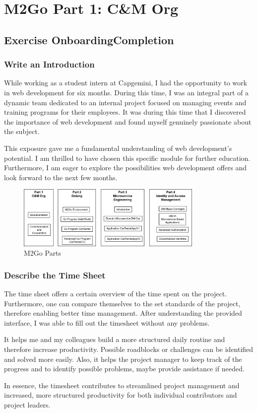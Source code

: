 \chapter{M2Go Part 1: C\&M Org}
\label{cha:cm_org}

\section{Exercise OnboardingCompletion}

\subsection{Write an Introduction}
While working as a student intern at Capgemini, I had the opportunity to work in web development for six months.
During this time, I was an integral part of a dynamic team dedicated to an internal project focused on managing events and training programs for their employees.
It was during this time that I discovered the importance of web development and found myself genuinely passionate about the subject.

This exposure gave me a fundamental understanding of web development's potential.
I am thrilled to have chosen this specific module for further education. 
Furthermore, I am eager to explore the possibilities web development offers and look forward to the next few months.

\begin{figure}[H]
    \centering
    \includegraphics[width=0.8\textwidth]{figures/m2go_parts.png}
    \caption{M2Go Parts}
    \label{fig:m2go_parts}
\end{figure}

\subsection{Describe the Time Sheet}
The time sheet offers a certain overview of the time spent on the project. 
Furthermore, one can compare themselves to the set standards of the project, therefore enabling better time management.
After understanding the provided interface, I was able to fill out the timesheet without any problems.

It helps me and my colleagues build a more structured daily routine and therefore increase productivity. Possible roadblocks or challenges can be identified and solved more easily.
Also, it helps the project manager to keep track of the progress and to identify possible problems, maybe provide assistance if needed.

In essence, the timesheet contributes to streamlined project management and increased, more structured productivity for both individual contributors and project leaders.